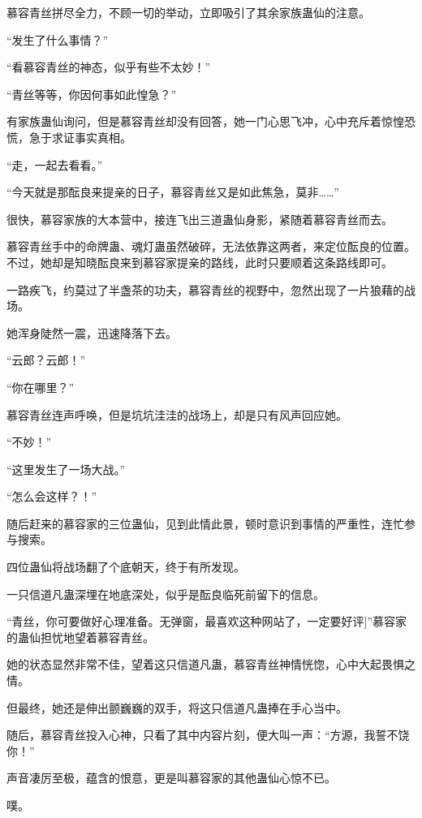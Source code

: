 
\begin{this_body}

慕容青丝拼尽全力，不顾一切的举动，立即吸引了其余家族蛊仙的注意。

“发生了什么事情？”

“看慕容青丝的神态，似乎有些不太妙！”

“青丝等等，你因何事如此惶急？”

有家族蛊仙询问，但是慕容青丝却没有回答，她一门心思飞冲，心中充斥着惊惶恐慌，急于求证事实真相。

“走，一起去看看。”

“今天就是那酝良来提亲的日子，慕容青丝又是如此焦急，莫非……”

很快，慕容家族的大本营中，接连飞出三道蛊仙身影，紧随着慕容青丝而去。

慕容青丝手中的命牌蛊、魂灯蛊虽然破碎，无法依靠这两者，来定位酝良的位置。不过，她却是知晓酝良来到慕容家提亲的路线，此时只要顺着这条路线即可。

一路疾飞，约莫过了半盏茶的功夫，慕容青丝的视野中，忽然出现了一片狼藉的战场。

她浑身陡然一震，迅速降落下去。

“云郎？云郎！”

“你在哪里？”

慕容青丝连声呼唤，但是坑坑洼洼的战场上，却是只有风声回应她。

“不妙！”

“这里发生了一场大战。”

“怎么会这样？！”

随后赶来的慕容家的三位蛊仙，见到此情此景，顿时意识到事情的严重性，连忙参与搜索。

四位蛊仙将战场翻了个底朝天，终于有所发现。

一只信道凡蛊深埋在地底深处，似乎是酝良临死前留下的信息。

“青丝，你可要做好心理准备。无弹窗，最喜欢这种网站了，一定要好评]”慕容家的蛊仙担忧地望着慕容青丝。

她的状态显然非常不佳，望着这只信道凡蛊，慕容青丝神情恍惚，心中大起畏惧之情。

但最终，她还是伸出颤巍巍的双手，将这只信道凡蛊捧在手心当中。

随后，慕容青丝投入心神，只看了其中内容片刻，便大叫一声：“方源，我誓不饶你！”

声音凄厉至极，蕴含的恨意，更是叫慕容家的其他蛊仙心惊不已。

噗。


\end{this_body}
